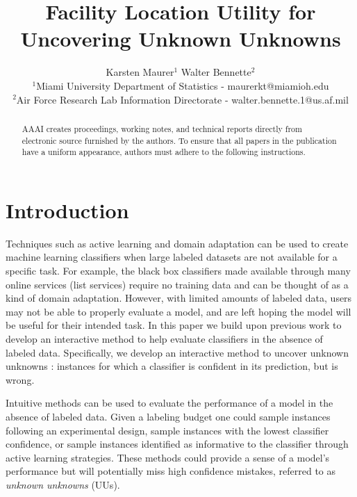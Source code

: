 \documentclass[letterpaper]{article} %
\begin{document}
%
\title{Facility Location Utility for Uncovering Unknown Unknowns}
\author{Karsten Maurer$^1$ \hspace{.2in} Walter Bennette$^2$\\
$^1$Miami University Department of Statistics - maurerkt@miamioh.edu\\ 
$^2$Air Force Research Lab Information Directorate - walter.bennette.1@us.af.mil \\
}

\maketitle
\begin{abstract}
AAAI creates proceedings, working notes, and technical reports directly from electronic source furnished by the authors. To ensure that all papers in the publication have a uniform appearance, authors must adhere to the following instructions. 
\end{abstract}

\section{Introduction}


Techniques such as active learning \citep{Settles2010} and domain adaptation \citep{Patel2014} can be used to create machine learning classifiers when large labeled datasets are not available for a specific task.  For example, the black box classifiers made available through many online services (list services) require no training data and can be thought of as a kind of domain adaptation.  However, with limited amounts of labeled data, users may not be able to properly evaluate a model, and are left hoping the model will be useful for their intended task.  In this paper we build upon previous work to develop an interactive method to help evaluate classifiers in the absence of labeled data.  Specifically, we develop an interactive method to uncover unknown unknowns \citep{Attenberg2015}: instances for which a classifier is confident in its prediction, but is wrong.  

Intuitive methods can be used to evaluate the performance of a model in the absence of labeled data.  Given a labeling budget one could sample instances following an experimental design, sample instances with the lowest classifier confidence, or sample instances identified as informative to the classifier through active learning strategies.  These methods could provide a sense of a model's performance but will potentially miss high confidence mistakes, referred to as \textit{unknown unknowns} (UUs).     
\end{document}
